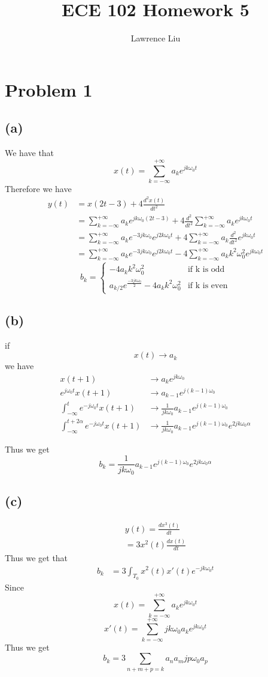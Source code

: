 \documentclass[12pt]{article}
\title{ECE 102 Homework 5}
\author{Lawrence Liu}
\begin{document}
\maketitle
\section{Problem 1}
\subsection*{(a)}
We have that 
$$x(t)=\sum_{k=-\infty}^{+\infty}a_ke^{jk\omega_0t}$$
Therefore we have
\begin{align*}
y(t)&=x(2t-3)+4\frac{d^2x(t)}{dt^2}\\
&=\sum_{k=-\infty}^{+\infty}a_ke^{jk\omega_0(2t-3)}+4\frac{d^2}{dt^2}\sum_{k=-\infty}^{+\infty}a_ke^{jk\omega_0t}\\
&=\sum_{k=-\infty}^{+\infty}a_ke^{-3jk\omega_0}e^{j2k\omega_0t}+4\sum_{k=-\infty}^{+\infty}a_k\frac{d^2}{dt^2}e^{jk\omega_0t}\\
&=\sum_{k=-\infty}^{+\infty}a_ke^{-3jk\omega_0}e^{j2k\omega_0t}-4\sum_{k=-\infty}^{+\infty}a_kk^2\omega_0^2 e^{jk\omega_0t}
\end{align*}
$$b_k=\boxed{\begin{cases}
-4a_k k^2\omega_0^2 & \text{if k is odd}\\
a_{k/2}e^{\frac{-3jk\omega_0}{2}}-4a_k k^2\omega_0^2& \text{if k is even}
\end{cases}
}
$$
\subsection*{(b)}
if 
$$x(t)\to a_k$$
we have
\begin{align*}
x(t+1)&\to a_ke^{jk\omega_0}\\
e^{j\omega_0t}x(t+1)&\to a_{k-1}e^{j(k-1)\omega_0}\\
\int_{-\infty}^{t}e^{-j\omega_0t}x(t+1)&\to\frac{1}{jk\omega_0} a_{k-1}e^{j(k-1)\omega_0}\\
\int_{-\infty}^{t+2\alpha}e^{-j\omega_0t}x(t+1)&\to\frac{1}{jk\omega_0} a_{k-1}e^{j(k-1)\omega_0}e^{2jk\omega_0\alpha}
\end{align*}

Thus we get
$$b_k=\boxed{\frac{1}{jk\omega_0} a_{k-1}e^{j(k-1)\omega_0}e^{2jk\omega_0\alpha}}$$
\subsection*{(c)}
\begin{align*}
y(t)=\frac{dx^3(t)}{dt}\\
=3x^2(t)\frac{dx(t)}{dt}
\end{align*}
Thus we get that
\begin{align*}
b_k&=3\int_{T_0}x^2(t)x'(t)e^{-jk\omega_0 t}
\end{align*}
Since 
$$x(t)=\sum_{k=-\infty}^{+\infty}a_ke^{jk\omega_0t}$$
$$x'(t)=\sum_{k=-\infty}^{+\infty}jk\omega_0a_ke^{jk\omega_0t}$$
Thus we get
$$b_k=\boxed{3\sum_{n+m+p=k}a_na_mjp\omega_0a_p}$$
\end{document}
